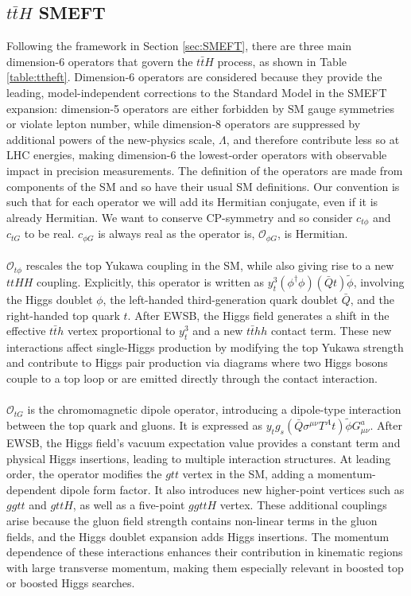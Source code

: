 \subsection{$t\bar{t}H$ SMEFT} 
Following the framework in Section \ref{sec:SMEFT}, there are three main dimension-6 operators that govern the $t\bar{t}H$ process, as shown in Table \ref{table:ttheft}. Dimension-6 operators are considered because they provide the leading, model-independent corrections to the Standard Model in the SMEFT expansion: dimension-5 operators are either forbidden by SM gauge symmetries or violate lepton number, while dimension-8 operators are suppressed by additional powers of the new-physics scale, $\Lambda$, and therefore contribute less so at LHC energies, making dimension-6 the lowest-order operators with observable impact in precision measurements. The definition of the operators are made from components of the SM and so have their usual SM definitions. Our convention is such that for each operator we will add its Hermitian conjugate, even if it is already Hermitian. We want to conserve CP-symmetry and so consider $c_{t\phi}$ and $c_{tG}$ to be real. $c_{\phi G}$ is always real as the operator is, $\mathcal{O}_{\phi G}$, is Hermitian.\\
\\
$\mathcal{O}_{t\phi}$ rescales the top Yukawa coupling in the SM, while also giving rise to a new $ttHH$ coupling. Explicitly, this operator is written as $y_t^3 (\phi^\dagger\phi)(\bar{Q}t)\tilde{\phi}$, involving the Higgs doublet $\phi$, the left-handed third-generation quark doublet $\bar{Q}$, and the right-handed top quark $t$. After EWSB, the Higgs field generates a shift in the effective $t\bar{t}h$ vertex proportional to $y_t^3$ and a new $t\bar{t}hh$ contact term. These new interactions affect single-Higgs production by modifying the top Yukawa strength and contribute to Higgs pair production via diagrams where two Higgs bosons couple to a top loop or are emitted directly through the contact interaction.\\
\\
$\mathcal{O}_{tG}$ is the chromomagnetic dipole operator, introducing a dipole-type interaction between the top quark and gluons. It is expressed as $y_t g_s (\bar{Q} \sigma^{\mu\nu}T^A t)\tilde{\phi}G^{a}_{\mu\nu}$. After EWSB, the Higgs field’s vacuum expectation value provides a constant term and physical Higgs insertions, leading to multiple interaction structures. At leading order, the operator modifies the $gtt$ vertex in the SM, adding a momentum-dependent dipole form factor. It also introduces new higher-point vertices such as $ggtt$ and $gttH$, as well as a five-point $ggttH$ vertex. These additional couplings arise because the gluon field strength contains non-linear terms in the gluon fields, and the Higgs doublet expansion adds Higgs insertions. The momentum dependence of these interactions enhances their contribution in kinematic regions with large transverse momentum, making them especially relevant in boosted top or boosted Higgs searches.\\
